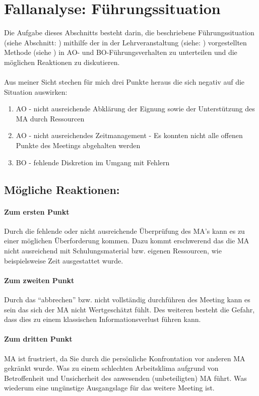 \section{Fallanalyse: Führungssituation}
Die Aufgabe dieses Abschnitts besteht darin, die beschriebene Führungssituation (siehe Abschnitt: ) mithilfe der in der Lehrveranstaltung (siehe: \cite{Duden2015}) vorgestellten Methode (siehe \cite{Wunderer2011}) in \ac{AO}- und \ac{BO}-Führungsverhalten zu unterteilen und  die möglichen Reaktionen zu diskutieren.\\
\\
Aus meiner Sicht stechen für mich  drei Punkte heraus die sich negativ auf die Situation auswirken:

\begin{enumerate}
\item \ac{AO} - nicht ausreichende Abklärung der Eignung sowie der Unterstützung des \ac{MA} durch Ressourcen
\item \ac{AO} - nicht ausreichendes Zeitmanagement  - Es konnten nicht alle offenen Punkte des Meetings abgehalten werden
\item \ac{BO} - fehlende Diskretion im Umgang mit Fehlern
\end{enumerate}


\subsection*{Mögliche Reaktionen:}

\paragraph*{Zum ersten Punkt}
Durch die fehlende oder nicht ausreichende Überprüfung des \ac{MA}'s kann es zu einer möglichen Überforderung kommen. 
Dazu kommt erschwerend das die \ac{MA} nicht ausreichend mit Schulungsmaterial bzw. eigenen Ressourcen, wie beispielsweise Zeit ausgestattet wurde.


\paragraph*{Zum zweiten Punkt}
Durch das "`abbrechen"' bzw. nicht vollständig durchführen des Meeting kann es sein das sich der \ac{MA} nicht Wertgeschätzt fühlt. 
Des weiteren besteht die Gefahr, dass dies zu einem klassischen Informationsverlust führen kann. 


\paragraph*{Zum dritten Punkt} \ac{MA} ist frustriert, da Sie durch die persönliche Konfrontation vor anderen \ac{MA} gekränkt wurde. 
Was zu einem schlechten Arbeitsklima aufgrund von Betroffenheit und Unsicherheit des anwesenden (unbeteiligten) \ac{MA} führt. 
Was wiederum eine ungünstige Ausgangslage für das weitere Meeting ist.

